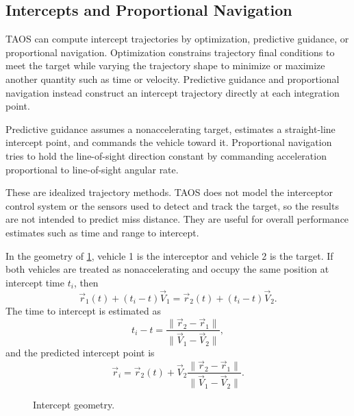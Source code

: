 \subsection{Intercepts and Proportional Navigation}\label{sec:intercepts-pn}

TAOS can compute intercept trajectories by optimization, predictive guidance, or
proportional navigation. Optimization constrains trajectory final conditions to meet
the target while varying the trajectory shape to minimize or maximize another
quantity such as time or velocity. Predictive guidance and proportional navigation
instead construct an intercept trajectory directly at each integration point.

Predictive guidance assumes a nonaccelerating target, estimates a straight-line
intercept point, and commands the vehicle toward it. Proportional navigation tries to
hold the line-of-sight direction constant by commanding acceleration proportional
to line-of-sight angular rate.

These are idealized trajectory methods. TAOS does not model the interceptor control
system or the sensors used to detect and track the target, so the results are not
intended to predict miss distance. They are useful for overall performance estimates
such as time and range to intercept.


In the geometry of \cref{fig:predictive-intercept-geometry}, vehicle 1 is the
interceptor and vehicle 2 is the target. If both vehicles are treated as
nonaccelerating and occupy the same position at intercept time $t_i$, then
\begin{equation}
  \vec r_1(t)+(t_i-t)\vec V_1
  =\vec r_2(t)+(t_i-t)\vec V_2.
  \label{eq:predictive-intercept-position-equality}
\end{equation}
The time to intercept is estimated as
\begin{equation}
  t_i-t=\frac{\lVert\vec r_2-\vec r_1\rVert}
              {\lVert\vec V_1-\vec V_2\rVert},
  \label{eq:predictive-time-to-intercept}
\end{equation}
and the predicted intercept point is
\begin{equation}
  \vec r_i=\vec r_2(t)+\vec V_2
  \frac{\lVert\vec r_2-\vec r_1\rVert}
       {\lVert\vec V_1-\vec V_2\rVert}.
  \label{eq:predictive-intercept-point}
\end{equation}

\begin{figure}[htbp]
  \centering
  
  \caption{Intercept geometry.}
  \label{fig:predictive-intercept-geometry}
\end{figure}

